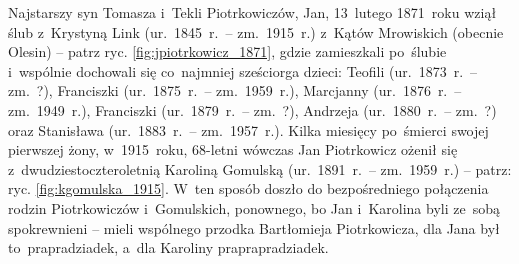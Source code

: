 Najstarszy syn Tomasza i~Tekli Piotrkowiczów, Jan, 13~lutego 1871~roku wziął
ślub z~Krystyną Link (ur.~1845~r.~-- zm.~1915~r.) z~Kątów Mrowiskich (obecnie
Olesin) -- patrz ryc. \ref{fig:jpiotrkowicz_1871}, gdzie zamieszkali
po~ślubie i~wspólnie dochowali się co~najmniej sześciorga dzieci: Teofili
(ur.~1873~r.~-- zm.~?), Franciszki (ur.~1875~r.~-- zm.~1959~r.), Marcjanny
(ur.~1876~r.~-- zm.~1949~r.), Franciszki (ur.~1879~r.~-- zm.~?), Andrzeja
(ur.~1880~r.~-- zm.~?) oraz Stanisława (ur.~1883~r.~-- zm.~1957~r.). Kilka
miesięcy po~śmierci swojej pierwszej żony, w~1915~roku, 68-letni wówczas Jan
Piotrkowicz ożenił się z~dwudziestoczteroletnią Karoliną Gomulską
(ur.~1891~r.~-- zm.~1959~r.) -- patrz: ryc. \ref{fig:kgomulska_1915}. W~ten
sposób doszło do bezpośredniego połączenia rodzin Piotrkowiczów i~Gomulskich,
ponownego, bo Jan i~Karolina byli ze~sobą spokrewnieni -- mieli wspólnego
przodka Bartłomieja Piotrkowicza, dla Jana był to~prapradziadek, a~dla
Karoliny praprapradziadek.

\begin{figure}[!ht]
\vspace*{1cm}
\centering
\hspace*{0.1cm}
\end{figure}

